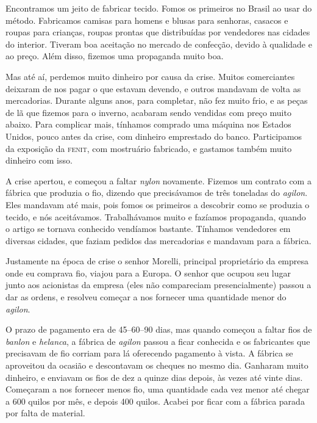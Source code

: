 Encontramos um jeito de fabricar tecido. Fomos os primeiros no Brasil ao usar do método. Fabricamos camisas para homens e blusas para
senhoras, casacos e roupas para crianças, roupas prontas que
distribuídas por vendedores nas cidades do interior. Tiveram boa
aceitação no mercado de confecção, devido à qualidade e ao preço. Além
disso, fizemos uma propaganda muito boa.

Mas até aí, perdemos muito dinheiro por causa da
crise. Muitos comerciantes deixaram de nos pagar o que estavam devendo, e
outros mandavam de volta as mercadorias. Durante alguns anos, para
completar, não fez muito frio, e as peças de lã que fizemos para o
inverno, acabaram sendo vendidas com preço muito abaixo. Para complicar mais, tínhamos comprado uma máquina nos Estados Unidos,
pouco antes da crise, com dinheiro emprestado do banco. Participamos da exposição da \textsc{fenit}, com mostruário fabricado, e gastamos também muito dinheiro com isso.

A crise apertou, e começou a faltar \textit{nylon} novamente. Fizemos um
contrato com a fábrica que produzia o fio, dizendo que precisávamos
de três toneladas do \textit{agilon}. Eles mandavam até mais, pois fomos os primeiros a descobrir como se produzia o tecido, e nós aceitávamos. Trabalhávamos muito e fazíamos propaganda, quando o
artigo se tornava conhecido vendíamos bastante. Tínhamos vendedores em diversas
cidades, que faziam pedidos das mercadorias e mandavam para a fábrica.

Justamente na época de crise o senhor Morelli, principal proprietário da empresa onde
eu comprava fio, viajou para a Europa. O senhor que
ocupou seu lugar junto aos acionistas da empresa (eles 
não compareciam presencialmente) passou a dar as ordens, e resolveu
começar a nos fornecer uma quantidade menor do \textit{agilon}. 

O prazo de pagamento era de 45--60--90 dias, mas quando começou a
faltar fios de \textit{banlon} e \textit{helanca}, a fábrica de \textit{agilon} passou a ficar
conhecida e os fabricantes que precisavam de fio corriam para lá
oferecendo pagamento à vista. A fábrica se aproveitou da ocasião e descontavam os cheques no mesmo dia. Ganharam muito dinheiro, e enviavam os fios de dez a quinze dias depois, às vezes até vinte dias. Começaram a nos fornecer menos fio, uma quantidade cada vez menor até
chegar a 600 quilos por mês, e depois 400 quilos. Acabei por ficar com a
fábrica parada por falta de material.

